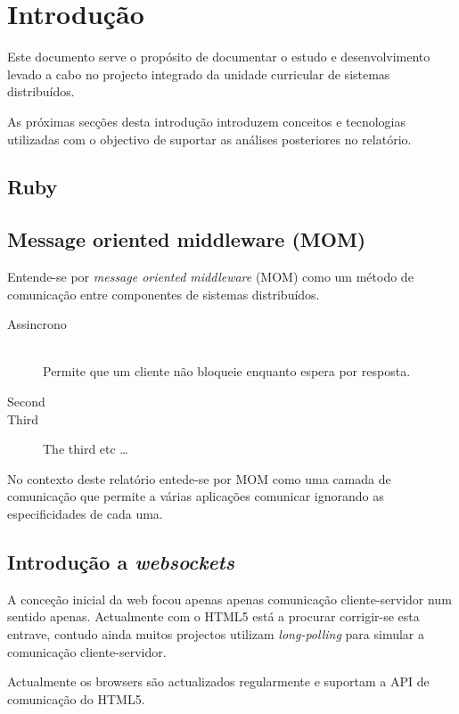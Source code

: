 
\section{Introdução}

Este documento serve o propósito de documentar o estudo e desenvolvimento levado a cabo no projecto integrado da unidade curricular de sistemas distribuídos.

As próximas secções desta introdução introduzem conceitos e tecnologias utilizadas com o objectivo de suportar as análises posteriores no relatório.

\subsection{Ruby}

\subsection{Message oriented middleware (MOM)} 

Entende-se por \textit{message oriented middleware} (MOM) como um método de comunicação entre componentes de sistemas distribuídos.


\begin{description}
  \item[Assincrono] \hfill \\
  	Permite que um cliente não bloqueie enquanto espera por resposta.
  \item[Second]
  \item[Third] The third etc \ldots
\end{description}

No contexto deste relatório entede-se por MOM como uma camada de comunicação que permite a várias aplicações comunicar ignorando as especificidades de cada uma.


\subsection{Introdução a \textit{websockets}}

A conceção inicial da web focou apenas apenas comunicação cliente-servidor num sentido apenas. Actualmente com o HTML5 está a procurar corrigir-se esta entrave, contudo ainda muitos projectos utilizam \textit{long-polling} para simular a comunicação cliente-servidor.

Actualmente os browsers são actualizados regularmente e suportam a API de comunicação do HTML5.

